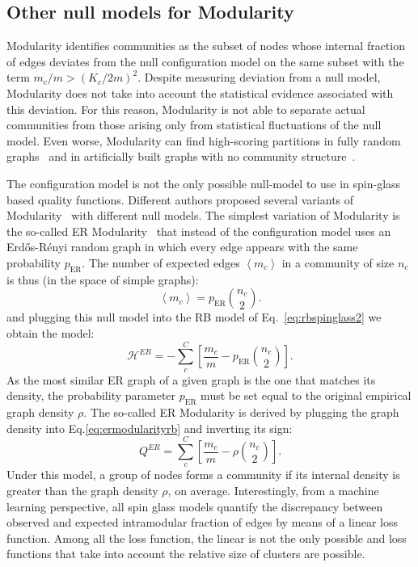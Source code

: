 \subsection{Other null models for Modularity}
Modularity identifies communities as the subset of nodes whose internal fraction of edges deviates from the null configuration model on the same subset with the term $m_c/m > (K_c/2m)^2$.
Despite measuring deviation from a null model, Modularity does not take into account the statistical evidence associated with this deviation. For this reason, Modularity is not able to separate actual communities from those arising only from statistical fluctuations of the null model. Even worse, Modularity can find high-scoring partitions in fully random graphs~\cite{guimera2004} and in artificially built graphs with no community structure~\cite{kehagias2013}.

The configuration model is not the only possible null-model to use in spin-glass based quality functions. Different authors proposed several variants of Modularity~\cite{ronhovde2010,ronhovde2009,traag2011} with different null models.
The simplest variation of Modularity is the so-called ER Modularity~\cite{traag2015} that instead of the configuration model uses an Erd\H{o}s-Rényi random graph in which every edge appears with the same probability $p_{\textrm{ER}}$. The number of expected edges $\left< m_c \right>$ in a community of size $n_c$ is thus (in the space of simple graphs):
\begin{equation}
\left< m_c \right> = p_{\textrm{ER}}\binom{n_c}{2}.
\end{equation}
and plugging this null model into the RB model of Eq.~\ref{eq:rbspinglass2} we obtain the model:
\begin{equation}\label{eq:ermodularityrb}
\mathcal{H}^{ER} = -\sum \limits_c^C \left[\frac{m_c}{m}  - p_{\textrm{ER}}\binom{n_c}{2} \right].
\end{equation}
As the most similar ER graph of a given graph is the one that matches its density, the probability parameter $p_{\textrm{ER}}$ must be set equal to the original empirical graph density $\rho$. The so-called ER Modularity is derived by plugging the graph density into Eq.\ref{eq:ermodularityrb} and inverting its sign: 
\begin{equation}
Q^{ER} = \sum \limits_c^C \left[\frac{m_c}{m}  - \rho \binom{n_c}{2} \right].
\end{equation}
Under this model, a group of nodes forms a community if its internal density is greater than the graph density $\rho$, on average.
Interestingly, from a machine learning perspective, all spin glass models quantify the discrepancy between observed and expected intramodular fraction of edges by means of a linear loss function. Among all the loss function, the linear is not the only possible and loss functions that take into account the relative size of clusters are possible.


